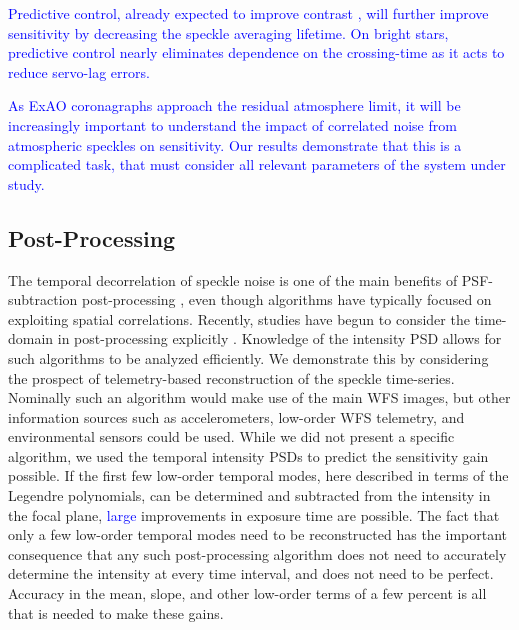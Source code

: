 \documentclass[10pt,preprint]{aastex631}
\newcommand{\jrmadd}[1]{\textcolor{blue}{#1}}
\begin{document}
\jrmadd{Predictive control, already expected to improve contrast \citep{2007JOSAA..24.2645P,2017JOSAA..34.1877C,2018JATIS...4a9001M, 2021arXiv210307566H}, will further improve sensitivity by decreasing the speckle averaging lifetime.  On bright stars, predictive control nearly eliminates dependence on the crossing-time as it acts to reduce servo-lag errors.}

\jrmadd{As ExAO coronagraphs approach the residual atmosphere limit, it will be increasingly important to understand the impact of correlated noise from atmospheric speckles on sensitivity.  Our results demonstrate that this is a complicated task, that must consider all relevant parameters of the system under study.}

\subsection{Post-Processing}
The temporal decorrelation of speckle noise is one of the main benefits of PSF-subtraction post-processing \citep{2006ApJ...641..556M,2008ApJ...673..647M}, even though algorithms have typically focused on exploiting spatial correlations.  Recently, studies have begun to consider the time-domain in post-processing explicitly \citep{2021A&A...646A..24S}.  Knowledge of the intensity PSD allows for such algorithms to be analyzed efficiently.  We demonstrate this by considering the prospect of telemetry-based reconstruction of the speckle time-series.  Nominally such an algorithm would make use of the main WFS images, but other information sources such as accelerometers, low-order WFS telemetry, and environmental sensors could be used.  While we did not present a specific algorithm, we used the temporal intensity PSDs to predict the sensitivity gain possible.  If the first few low-order temporal modes, here described in terms of the Legendre polynomials, can be determined and subtracted from the intensity in the focal plane, \jrmadd{large} improvements in exposure time are possible.  The fact that only a few low-order temporal modes need to be reconstructed has the important consequence that any such post-processing algorithm does not need to accurately determine the intensity at every time interval, and does not need to be perfect.  Accuracy in the mean, slope, and other low-order terms of a few percent is all that is needed to make these gains.
\end{document}
